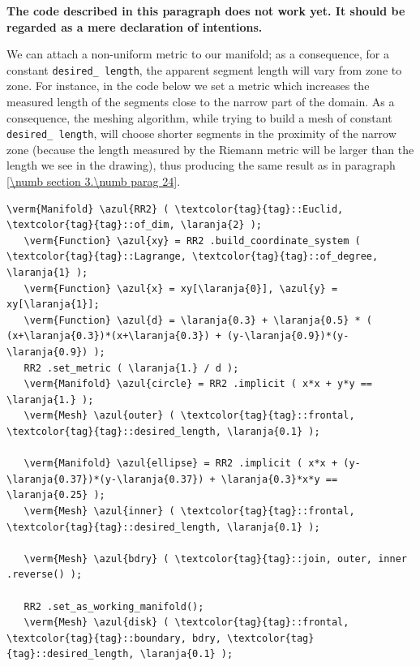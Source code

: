 {\normalfont\bfseries The code described in this paragraph does not work yet.
It should be regarded as a mere declaration of intentions.}
\medskip

We can attach a non-uniform metric to our manifold; as a consequence, for a constant
{\small\tt desired\_\,length}, the apparent segment length will vary from zone to zone.
For instance, in the code below we set a metric which increases the measured length
of the segments close to the narrow part of the domain.
As a consequence, the meshing algorithm, while trying to build a mesh of constant
{\small\tt desired\_\,length}, will choose shorter segments in the proximity of the narrow zone
(because the length measured by the Riemann metric will be larger than the length
we see in the drawing), thus producing the same result as in paragraph
\ref{\numb section 3.\numb parag 24}.

\begin{Verbatim}[commandchars=\\\{\},formatcom=\small\tt,frame=single,
   label=code not working,rulecolor=\color{moldura},
   baselinestretch=0.94,framesep=2mm                                   ]
   \verm{Manifold} \azul{RR2} ( \textcolor{tag}{tag}::Euclid, \textcolor{tag}{tag}::of_dim, \laranja{2} );
   \verm{Function} \azul{xy} = RR2 .build_coordinate_system ( \textcolor{tag}{tag}::Lagrange, \textcolor{tag}{tag}::of_degree, \laranja{1} );
   \verm{Function} \azul{x} = xy[\laranja{0}], \azul{y} = xy[\laranja{1}];
   \verm{Function} \azul{d} = \laranja{0.3} + \laranja{0.5} * ( (x+\laranja{0.3})*(x+\laranja{0.3}) + (y-\laranja{0.9})*(y-\laranja{0.9}) );
   RR2 .set_metric ( \laranja{1.} / d );
   \verm{Manifold} \azul{circle} = RR2 .implicit ( x*x + y*y == \laranja{1.} );
   \verm{Mesh} \azul{outer} ( \textcolor{tag}{tag}::frontal, \textcolor{tag}{tag}::desired_length, \laranja{0.1} );

   \verm{Manifold} \azul{ellipse} = RR2 .implicit ( x*x + (y-\laranja{0.37})*(y-\laranja{0.37}) + \laranja{0.3}*x*y == \laranja{0.25} );
   \verm{Mesh} \azul{inner} ( \textcolor{tag}{tag}::frontal, \textcolor{tag}{tag}::desired_length, \laranja{0.1} );

   \verm{Mesh} \azul{bdry} ( \textcolor{tag}{tag}::join, outer, inner .reverse() );

   RR2 .set_as_working_manifold();
   \verm{Mesh} \azul{disk} ( \textcolor{tag}{tag}::frontal, \textcolor{tag}{tag}::boundary, bdry, \textcolor{tag}{tag}::desired_length, \laranja{0.1} );
\end{Verbatim}

